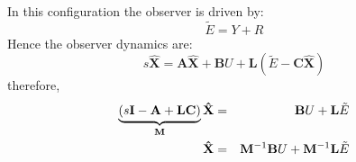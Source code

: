 In this configuration the observer is driven by:
\[
\tilde E =  Y + R
\] 
Hence the observer dynamics are:
\[
s\hat{\mathbf{X}}=\mathbf{A}\hat{\mathbf{X}}+\mathbf{B}U+\mathbf{L}(\tilde E - \mathbf{C}\hat{\mathbf{X}})
\]
therefore,
\begin{eqnarray*}
	\underbrace {\left( {s{\bf{I}} - {\bf{A}} + {\bf{LC}}} \right)}_{\bf{M}}{\bf{\hat X}} & = & {\bf{B}}U + {\bf{L}}\tilde E \\
	{\bf{\hat X}} & = & {\bf{M}}^{ - 1} {\bf{B}}U + {\bf{M}}^{ - 1} {\bf{L}}\tilde E
\end{eqnarray*}



\endinput

